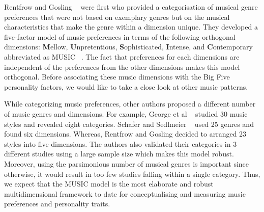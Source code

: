 \par Rentfrow and Gosling ~\cite{rentfrow2003re} were first who provided a categorisation of musical genre preferences that were not based on exemplary genres but on the musical characteristics that make the genre within a dimension unique. They developed a five-factor model of music preferences in terms of the following orthogonal dimensions: \textbf{M}ellow, \textbf{U}npretentious, \textbf{S}ophisticated, \textbf{I}ntense, and \textbf{C}ontemporary abbreviated as MUSIC ~\cite{rentfrow2011structure}. The fact that preferences for each dimensions are independent of the preferences from the other dimensions makes this model orthogonal. Before associating these music dimensions with the Big Five personality factors, we would like to take a close look at other music patterns. 

\par While categorizing music preferences, other authors proposed a different number of music genres and dimensions. For example, George et al ~\cite{george2007association} studied 30 music styles and revealed eight categories. Schafer and Sedlmeier ~\cite{schafer2009functions} used 25 genres and found six dimensions. Whereas, Rentfrow and Gosling decided to arranged 23 styles into five dimensions. The authors also validated their categories in 3 different studies using a large sample size which makes this model robust. Moreover, using the parsimonious number of musical genres is important since otherwise, it would result in too few studies falling within a single category. Thus, we expect that the MUSIC model is the most elaborate and robust multidimensional framework to date for conceptualising and measuring music preferences and personality traits. 

